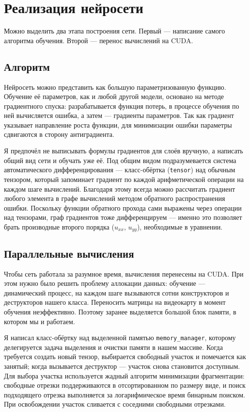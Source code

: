 \documentclass[12pt,a4paper]{article}
\begin{document}
\section{Реализация нейросети}

Можно выделить два этапа построения сети. Первый --- написание самого алгоритма
обучения. Второй --- перенос вычислений на CUDA.

\subsection{Алгоритм}

Нейросеть можно представить как большую параметризованную функцию. Обучение её
параметров, как и любой другой модели, основано на методе градиентного спуска:
разрабатывается функция потерь, в процессе обучения по ней вычисляется ошибка, а
затем --- градиенты параметров. Так как градиент указывает направление роста
функции, для минимизации ошибки параметры сдвигаются в сторону антиградиента.

Я предпочёл не выписывать формулы градиентов для слоёв вручную, а написать общий
вид сети и обучать уже её. Под общим видом подразумевается система
автоматического дифференцирования --- класс-обёртка (\texttt{tensor}) над
обычным тензором, который запоминает градиент по каждой арифметической операции
на каждом шаге вычислений. Благодаря этому всегда можно рассчитать градиент
любого элемента в графе вычислений методом обратного распространения ошибки.
Поскольку функции обратного прохода сами выражены через операции над тензорами,
граф градиентов тоже дифференцируем --- именно это позволяет брать производные
второго порядка ($u_{xx}$, $u_{yy}$), необходимые в уравнении.

\subsection{Параллельные вычисления}

Чтобы сеть работала за разумное время, вычисления перенесены на CUDA. При этом
нужно было решить проблему аллокации данных: обучение --- динамический процесс,
на каждом шаге вызываются сотни конструкторов и деструкторов нашего класса.
Переносить матрицы на видеокарту в момент обучения неэффективно. Поэтому заранее
выделяется большой блок памяти, в котором мы и работаем.

Я написал класс-обёртку над выделенной памятью \texttt{memory\_manager}, которому
делегируется задача выделения и очистки памяти в нашем массиве. Когда требуется
создать новый тензор, выбирается свободный участок и помечается как занятый;
когда вызывается деструктор --- участок снова становится доступным. Для выбора
участка используется жадный алгоритм минимизации фрагментации: свободные отрезки
поддерживаются в отсортированном по размеру виде, и поиск подходящего отрезка
выполняется за логарифмическое время бинарным поиском. При освобождении участок
сливается с соседними свободными отрезками.
\end{document}
